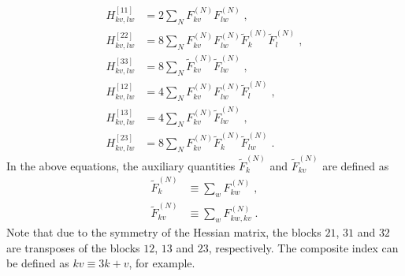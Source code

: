 \documentclass[aip,amsmath,amssymb,reprint]{revtex4-1}
\begin{document}
\begin{subequations}
 \begin{align}
  H^{[11]}_{kv,lw} &= 2\sum_N F^{(N)}_{kv} F^{(N)}_{lw} \;,\\
  H^{[22]}_{kv,lw} &= 8\sum_N F^{(N)}_{kv} F^{(N)}_{lw} \widetilde{F}^{(N)}_k \widetilde{F}^{(N)}_l \;,\\
  H^{[33]}_{kv,lw} &= 8\sum_N \widetilde{F}^{(N)}_{kv} \widetilde{F}^{(N)}_{lw} \;,\\
  H^{[12]}_{kv,lw} &= 4\sum_N F^{(N)}_{kv} F^{(N)}_{lw} \widetilde{F}^{(N)}_l \;,\\
  H^{[13]}_{kv,lw} &= 4\sum_N F^{(N)}_{kv} \widetilde{F}^{(N)}_{lw} \;,\\
  H^{[23]}_{kv,lw} &= 8\sum_N F^{(N)}_{kv} \widetilde{F}^{(N)}_k \widetilde{F}^{(N)}_{lw} \;.
 \end{align}
\end{subequations}
%
In the above equations, the auxiliary quantities $\widetilde{F}^{(N)}_k$ 
and $\widetilde{F}^{(N)}_{kv}$ are defined as
%
\begin{subequations}
 \begin{align}
  \widetilde{F}^{(N)}_k    &\equiv \sum_w F^{(N)}_{kw} \;,\\
  \widetilde{F}^{(N)}_{kv} &\equiv \sum_w F^{(N)}_{kw,kv} \;.
 \end{align}
\end{subequations}
%
Note that due to the symmetry of the Hessian matrix, the blocks $21$, $31$ and $32$
are transposes of the blocks $12$, $13$ and $23$, respectively. The composite index
can be defined as $kv \equiv 3k+v$, for example.

\end{document}
